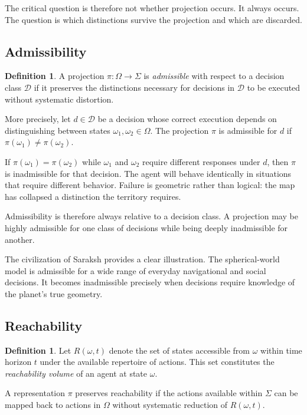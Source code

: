 \documentclass[12pt, a4paper]{article}
\theoremstyle{plain}
\theoremstyle{definition}
\newtheorem{definition}[theorem]{Definition}
\theoremstyle{remark}
\begin{document}
The critical question is therefore not whether
projection occurs. It always occurs. The question
is which distinctions survive the projection and
which are discarded.

\subsection{Admissibility}

\begin{definition}
A projection $\pi: \Omega \to \Sigma$ is
\emph{admissible} with respect to a decision class
$\mathcal{D}$ if it preserves the distinctions
necessary for decisions in $\mathcal{D}$ to be
executed without systematic distortion.
\end{definition}

More precisely, let $d \in \mathcal{D}$ be a
decision whose correct execution depends on
distinguishing between states $\omega_1, \omega_2
\in \Omega$. The projection $\pi$ is admissible
for $d$ if $\pi(\omega_1) \neq \pi(\omega_2)$.

If $\pi(\omega_1) = \pi(\omega_2)$ while $\omega_1$
and $\omega_2$ require different responses under
$d$, then $\pi$ is inadmissible for that decision.
The agent will behave identically in situations
that require different behavior. Failure is
geometric rather than logical: the map has
collapsed a distinction the territory requires.

Admissibility is therefore always relative to a
decision class. A projection may be highly
admissible for one class of decisions while being
deeply inadmissible for another.

The civilization of Saraksh provides a clear
illustration. The spherical-world model is
admissible for a wide range of everyday navigational
and social decisions. It becomes inadmissible
precisely when decisions require knowledge of the
planet's true geometry.

\subsection{Reachability}

\begin{definition}
Let $R(\omega, t)$ denote the set of states
accessible from $\omega$ within time horizon $t$
under the available repertoire of actions. This
set constitutes the \emph{reachability volume}
of an agent at state $\omega$.
\end{definition}

A representation $\pi$ preserves reachability
if the actions available within $\Sigma$ can be
mapped back to actions in $\Omega$ without
systematic reduction of $R(\omega, t)$.
\end{document}
